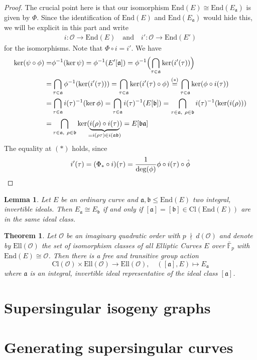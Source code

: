 \documentclass{scrartcl}
\newcommand{\F}{\mathbb{F}}
\newcommand{\End}{\mathrm{End}}
\newcommand{\notdivides}{\ \nmid \ }
\newcommand{\Cl}{\mathrm{Cl}}
\renewcommand{\a}{\mathfrak{a}}
\renewcommand{\b}{\mathfrak{b}}
\newcommand{\Ell}{\mathrm{Ell}}
\renewcommand{\O}{\mathcal{O}}
\newtheorem{theorem}[prop]{Theorem}
\newtheorem{lemma}[prop]{Lemma}
\theoremstyle{definition}
\begin{document}
\begin{proof}
    The crucial point here is that our isomorphism $\End(E) \cong \End(E_\a)$ is given by $\Phi$.
    Since the identification of $\End(E)$ and $\End(E_\a)$ would hide this, we will be explicit in this part and write
    \begin{align*}
        i: \O \to \End(E) \quad \text{and} \quad i': \O \to \End(E')
    \end{align*}
    for the isomorphisms.
    Note that $\Phi \circ i = i'$.
    We have
    \begin{align*}
        \ker(\psi \circ \phi) =& \phi^{-1}(\ker\psi) = \phi^{-1}(E'[\mathfrak{a}]) = \phi^{-1}\Bigl( \bigcap_{\tau \in \mathfrak{a}} \ker(i'(\tau)) \Bigr) \\
        =& \bigcap_{\tau \in \mathfrak{a}} \phi^{-1}(\ker(i'(\tau))) = \bigcap_{\tau \in \mathfrak{a}} \ker(i'(\tau) \circ \phi) \overset{(*)}{=} \bigcap_{\tau \in \mathfrak{a}} \ker(\phi \circ i(\tau)) \\
        =& \bigcap_{\tau \in \mathfrak{a}} i(\tau)^{-1}(\ker\phi) = \bigcap_{\tau \in \mathfrak{a}} i(\tau)^{-1}(E[\mathfrak{b}]) = \bigcap_{\tau \in \mathfrak{a}, \ \rho \in \mathfrak{b}} i(\tau)^{-1}(\ker(i(\rho))) \\
        =& \bigcap_{\tau \in \mathfrak{a}, \ \rho \in \mathfrak{b}} \ker(\underbrace{i(\rho) \circ i(\tau)}_{\mathclap{= i(\rho\tau) \in i(\a\b)}}) = E[\mathfrak{b}\mathfrak{a}]
    \end{align*}
    The equality at $(*)$ holds, since
    \begin{equation*}
        i'(\tau) = (\Phi_* \circ i)(\tau) = \frac 1 {\deg(\phi)} \phi \circ i(\tau) \circ \hat{\phi} \qedhere
    \end{equation*}
\end{proof}
\begin{lemma}
    Let $E$ be an ordinary curve and $\a, \b \leq \End(E)$ two integral, invertible ideals.
    Then $E_\a \cong E_\b$ if and only if $[\a] = [\b] \in \Cl(\End(E))$ are in the same ideal class.
\end{lemma}
\begin{theorem}
    Let $\O$ be an imaginary quadratic order with $p \notdivides d(\O)$ and denote by $\Ell(\O)$ the set of isomorphism classes of all Elliptic Curves $E$ over $\bar{\F}_p$ with $\End(E) \cong \O$.
    Then there is a free and transitive group action
    \begin{equation*}
        \Cl(\O) \times \Ell(\O) \to \Ell(\O), \quad ([\a], E) \mapsto E_\a
    \end{equation*}
    where $\a$ is an integral, invertible ideal representative of the ideal class $[\a]$.
\end{theorem}

\section{Supersingular isogeny graphs}

\section{Generating supersingular curves}
\end{document}
